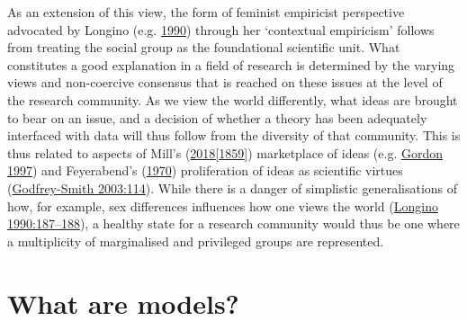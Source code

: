 \documentclass[
  12pt,
  a4paper,
  oneside]{book}
\begin{document}
As an extension of this view, the form of feminist empiricist perspective advocated by Longino (e.g. \protect\hyperlink{ref-longino1990}{1990}) through her `contextual empiricism' follows from treating the social group as the foundational scientific unit. What constitutes a good explanation in a field of research is determined by the varying views and non-coercive consensus that is reached on these issues at the level of the research community. As we view the world differently, what ideas are brought to bear on an issue, and a decision of whether a theory has been adequately interfaced with data will thus follow from the diversity of that community. This is thus related to aspects of Mill's (\protect\hyperlink{ref-mill1859}{2018{[}1859{]}}) \textquotesingle marketplace of ideas\textquotesingle{} (e.g. \protect\hyperlink{ref-gordon1997}{Gordon 1997}) and Feyerabend's (\protect\hyperlink{ref-feyerabend1970}{1970}) \textquotesingle proliferation of ideas\textquotesingle{} as scientific virtues (\protect\hyperlink{ref-godfrey-smith2003}{Godfrey-Smith 2003:114}). While there is a danger of simplistic generalisations of how, for example, sex differences influences how one views the world (\protect\hyperlink{ref-longino1990}{Longino 1990:187--188}), a healthy state for a research community would thus be one where a multiplicity of marginalised and privileged groups are represented.

\hypertarget{what-are-models}{%
\section{What are models?}\label{what-are-models}}
\end{document}
